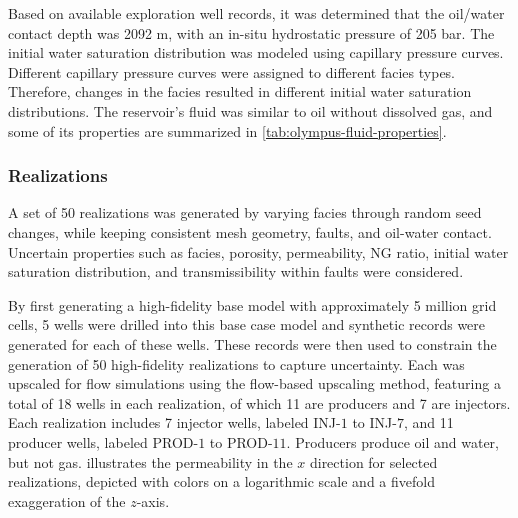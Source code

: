 Based on available exploration well records, it was determined that the oil/water contact depth was 2092 m, 
with an in-situ hydrostatic pressure of 205 bar. 
The initial water saturation distribution was modeled using capillary pressure curves. 
Different capillary pressure curves were assigned to different facies types. 
Therefore, changes in the facies resulted in different initial water saturation distributions.
The reservoir's fluid was similar to oil without dissolved gas, and some of its properties are summarized in \cref{tab:olympus-fluid-properties}.
%
\begin{table}[htbp]
\end{table}

    \subsubsection{Realizations}
    A set of 50 realizations was generated by varying facies through random seed changes,
    while keeping consistent mesh geometry, faults, and oil-water contact. 
    Uncertain properties such as facies, porosity, permeability, NG ratio,
    initial water saturation distribution, and transmissibility within faults were considered. 

    By first generating a high-fidelity base model with approximately 5 million grid cells,
    5 wells were drilled into this base case model and synthetic records were generated for each of these wells.
    These records were then used to constrain the generation of 50 high-fidelity realizations to capture uncertainty. 
    Each was upscaled for flow simulations using the flow-based upscaling method, 
    featuring a total of 18 wells in each realization, of which 11 are producers and 7 are injectors. 
    Each realization includes 7 injector wells, labeled INJ-$1$ to INJ-$7$, and 11 producer wells, labeled PROD-$1$ to PROD-$11$.
    Producers produce oil and water, but not gas.
     illustrates the permeability in the $x$ direction for selected realizations, 
    depicted with colors on a logarithmic scale and a fivefold exaggeration of the $z$-axis.

